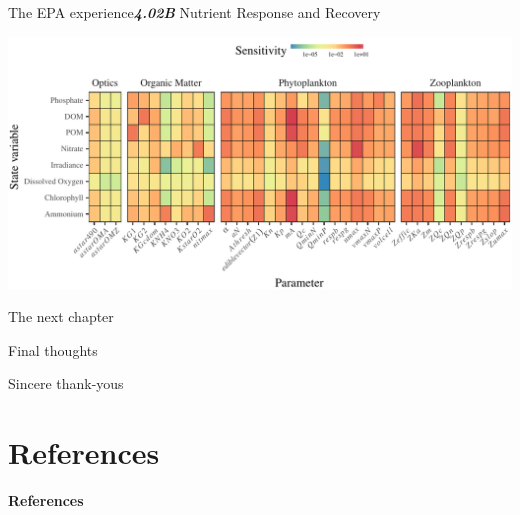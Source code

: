 \documentclass[serif]{beamer}\usepackage[]{graphicx}\usepackage[]{color}
\newcommand{\emtxt}[1]{\textbf{\textit{#1}}}
\begin{document}
\begin{frame}{The EPA experience}{\emtxt{4.02B} Nutrient Response and Recovery}
\centerline{\includegraphics[width=\textwidth]{fig/senstile.pdf}}
\end{frame}

\begin{frame}{The next chapter}{}

\end{frame}

\begin{frame}{Final thoughts}{}

\end{frame}

\begin{frame}{Sincere thank-yous}{}

\end{frame}

\section{References}
\begin{frame}[allowframebreaks,t]{\textbf{References}}
\tiny
{}


\end{frame}
\end{document}
